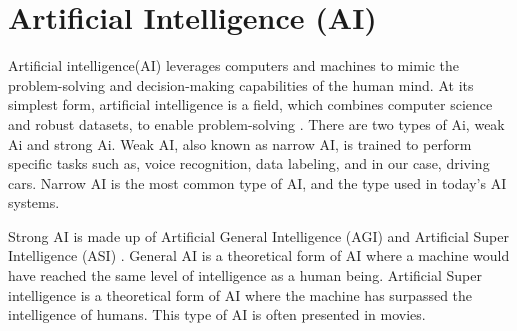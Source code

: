 \section{Artificial Intelligence (AI)}
Artificial intelligence(AI) leverages computers and machines to mimic the problem-solving and decision-making capabilities of the human mind. At its simplest form, artificial intelligence is a field, which combines computer science and robust datasets, to enable problem-solving \parencite{artificial_intelligence}. There are two types of Ai, weak Ai and strong Ai. Weak AI, also known as narrow AI, is trained to perform specific tasks such as, voice recognition, data labeling, and in our case, driving cars. Narrow AI is the most common type of AI, and the type used in today's AI systems. 

Strong AI is made up of Artificial General Intelligence (AGI) and Artificial Super Intelligence (ASI) \parencite{artificial_intelligence}. General AI is a theoretical form of AI where a machine would have reached the same level of intelligence as a human being. Artificial Super intelligence is a theoretical form of AI where the machine has surpassed the intelligence of humans. This type of AI is often presented in movies. 